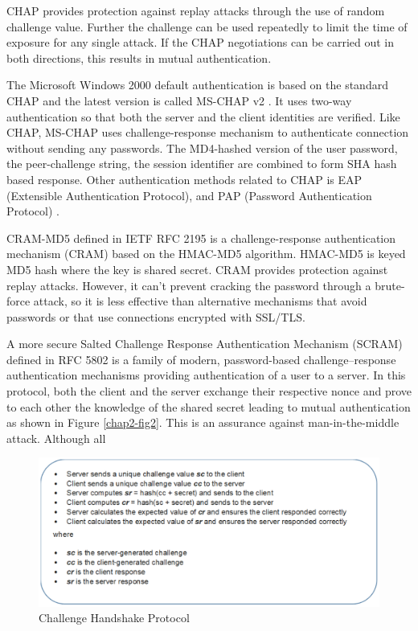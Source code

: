 \begin{multicols}{2}
CHAP provides protection against replay attacks through the use of random challenge value. Further the challenge can be used repeatedly to limit the time of exposure for any single attack. If the CHAP negotiations can be carried out in both directions, this results in mutual authentication.

The Microsoft Windows 2000 default authentication is based on the standard CHAP and the latest version is called MS-CHAP v2 \cite{chap2-key4}. It uses two-way authentication so that both the server and the client identities are verified. Like CHAP, MS-CHAP uses challenge-response mechanism to authenticate connection without sending any passwords. The MD4-hashed version of the user password, the peer-challenge string, the session identifier are combined to form SHA hash based response. Other authentication methods related to CHAP is EAP (Extensible Authentication Protocol), and PAP (Password Authentication Protocol) \cite{chap2-key4}.

CRAM-MD5 defined in IETF RFC 2195 \cite{chap2-key6} is a challenge-response authentication mechanism (CRAM) based on the HMAC-MD5 algorithm. HMAC-MD5 is keyed MD5 hash where the key is shared secret. CRAM provides protection against replay attacks. However, it can't prevent cracking the password through a brute-force attack, so it is less effective than alternative mechanisms that avoid passwords or that use connections encrypted with SSL/TLS. 

{\parfillskip=0pt
A more secure Salted Challenge Response Authentication Mechanism (SCRAM) defined in RFC 5802 \cite{chap2-key7} is a family of modern, password-based challenge--response authentication mechanisms providing authentication of a user to a server. In this protocol, both the client and the server exchange their respective nonce and prove to each other the knowledge of the shared secret leading to mutual authentication as shown in Figure \ref{chap2-fig2}. This is an assurance against man-in-the-middle attack. Although all\par} 
\end{multicols}

\begin{figure}[!ht]
\centering
\includegraphics[scale=.8]{src/Figures/chap2/1.eps}
\caption{Challenge Handshake Protocol}\label{chap2-fig1}
\end{figure}

